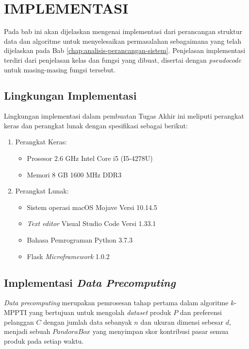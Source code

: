 \chapter{IMPLEMENTASI} \label{chap:implementasi}

\tab Pada bab ini akan dijelaskan mengenai implementasi dari perancangan struktur data dan algoritme untuk menyelesaikan permasalahan \problemDua{} sebagaimana yang telah dijelaskan pada Bab \ref{chap:analisis-perancangan-sistem}. Penjelasan implementasi terdiri dari penjelasan kelas dan fungsi yang dibuat, disertai dengan \textit{pseudocode} untuk masing-masing fungsi tersebut.

\section{Lingkungan Implementasi}
\tab Lingkungan implementasi dalam pembuatan Tugas Akhir ini meliputi perangkat keras dan perangkat lunak dengan spesifikasi sebagai berikut:

\begin{enumerate}
	\item Perangkat Keras:
	\begin{itemize}
		\item Prosesor 2.6 GHz Intel Core i5 (I5-4278U)
		\item Memori 8 GB 1600 MHz DDR3
	\end{itemize}
	\item Perangkat Lunak:
	\begin{itemize}
		\item Sistem operasi macOS Mojave Versi 10.14.5
		\item \textit{Text editor} Visual Studio Code Versi 1.33.1
		\item Bahasa Pemrograman Python 3.7.3
		\item Flask \textit{Microframework} 1.0.2
	\end{itemize}			
\end{enumerate}

\section{Implementasi \textit{Data Precomputing}}
\tab \textit{Data precomputing} merupakan pemrosesan tahap pertama dalam algoritme $k$-MPPTI yang bertujuan untuk mengolah \textit{dataset} produk $P$ dan preferensi pelanggan $C$ dengan jumlah data sebanyak $n$ dan ukuran dimensi sebesar $d$, menjadi sebuah $Pandora Box$ yang menyimpan skor kontribusi pasar semua produk pada setiap waktu. 

